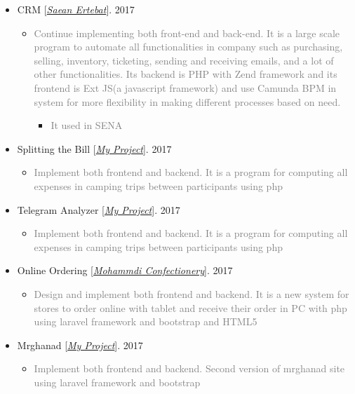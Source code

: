 \documentclass[10pt,a4paper,sans]{moderncv} %
\begin{document}
\begin{itemize}
		\item CRM [\href{http://www.senatelecom.com/}{\emph{Saean Ertebat}}]. \hfill 2017
		\begin{itemize}
			\item \textcolor{gray} {Continue implementing both front-end and back-end. It is a large scale program to automate all functionalities in company such as purchasing, selling, inventory, ticketing, sending and receiving emails, and a lot of other functionalities. Its backend is PHP with Zend framework and its frontend is Ext JS(a javascript framework) and use Camunda BPM in system for more flexibility in making different processes based on need.}
			\begin{itemize}
				\item \textcolor{gray} {It used in SENA}
			\end{itemize}
		\end{itemize}

		\item Splitting the Bill [\href{mailto:ma.mohammadizadeh@gmail.com}{\emph{My Project}}]. \hfill 2017
		\begin{itemize}
			\item \textcolor{gray} {Implement both frontend and backend. It is a program for computing all expenses in camping trips between participants using php}
		\end{itemize}

		\item Telegram Analyzer [\href{mailto:ma.mohammadizadeh@gmail.com}{\emph{My Project}}]. \hfill 2017
		\begin{itemize}
			\item \textcolor{gray} {Implement both frontend and backend. It is a program for computing all expenses in camping trips between participants using php}
		\end{itemize}

		\item Online Ordering [\href{http://#/}{\emph{Mohammdi Confectionery}}]. \hfill 2017
		\begin{itemize}
			\item \textcolor{gray} {Design and implement both frontend and backend. It is a new system for stores to order online with tablet and receive their order in PC with php using laravel framework and bootstrap and HTML5}
		\end{itemize}

		\item Mrghanad [\href{mailto:ma.mohammadizadeh@gmail.com}{\emph{My Project}}]. \hfill 2017
		\begin{itemize}
			\item \textcolor{gray} {Implement both frontend and backend. Second version of mrghanad site using laravel framework and bootstrap}
		\end{itemize}


\end{itemize}
\end{document}
